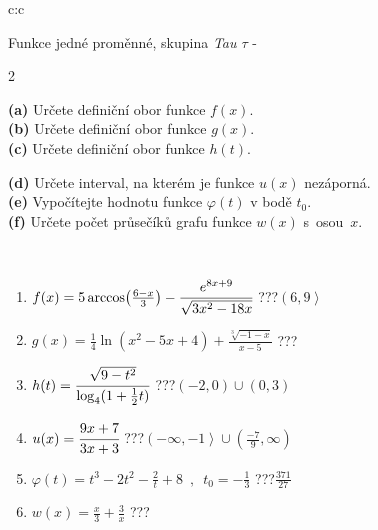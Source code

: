 \documentclass[10pt]{report}
\begin{document}
\begin{tabular}{c:c}
\begin{minipage}[c][104.5mm][t]{0.5\linewidth}
\begin{center}
\vspace{7mm}
{\huge Funkce jedné proměnné, skupina \textit{Tau $\tau$} -}\\[5mm]
\begin{minipage}{0.95\linewidth}
\begin{center}
{\small \begin{multicols}{2} \raggedright
\textbf{(a)} Určete definiční obor funkce \(f(x)\). \\[1mm]
\textbf{(b)} Určete definiční obor funkce \(g(x)\). \\[1mm]
\textbf{(c)} Určete definiční obor funkce \(h(t)\). \par \columnbreak
\textbf{(d)} Určete interval, na kterém je funkce \(u(x)\) nezáporná. \\[1mm]
\textbf{(e)} Vypočítejte hodnotu funkce \(\varphi(t)\) v bodě \(t_0\). \\[1mm]
\textbf{(f)} Určete počet průsečíků grafu funkce \(w(x)\) s~osou~\(x\). \\[1mm]
\end{multicols}
}
\end{center}
\end{minipage}
\\[4mm]
\begin{minipage}{0.79\linewidth}
\begin{center}
\begin{varwidth}{\linewidth}
\begin{enumerate}
\small
\item $f(x) = 5\arccos\!\left( \frac{6-x}{3} \right) - \cfrac{e^{8x+9}}{\sqrt{3x^2-18x}}$\quad \dotfill\; ???\;\dotfill \quad $\left(6 , 9\right\rangle$
\item $g(x) = \frac{1}{4} \ln{\!(x^2-5x+4)}+\frac{\sqrt[3]{-1-x}}{x-5}$\quad \dotfill\; ???\;\dotfill {}
\item $h(t) = \cfrac{\sqrt{9-t^2}}{\log_4(1+\frac{1}{2}t)}$\quad \dotfill\; ???\;\dotfill \quad $\left(-2 , 0\right)\cup\left(0 , 3\right)$
\item $u(x) = \cfrac{9x+7}{3x+3}$\quad \dotfill\; ???\;\dotfill \quad $\left(-\infty , -1\right\rangle\cup\left(\frac{-7}{9} , \infty\right)$
\item $\varphi(t) = t^3-2t^2-\frac{2}{t}+8 \enspace , \enspace t_0=-\frac{1}{3}$\quad \dotfill\; ???\;\dotfill \quad $\frac{371}{27}$
\item $w(x) = \frac{x}{3}+\frac{3}{x}$\quad \dotfill\; ???\;\dotfill {}

\end{enumerate}
\end{varwidth}
\end{center}
\end{minipage}
\end{center}
\end{minipage}
\end{tabular}
\end{document}
